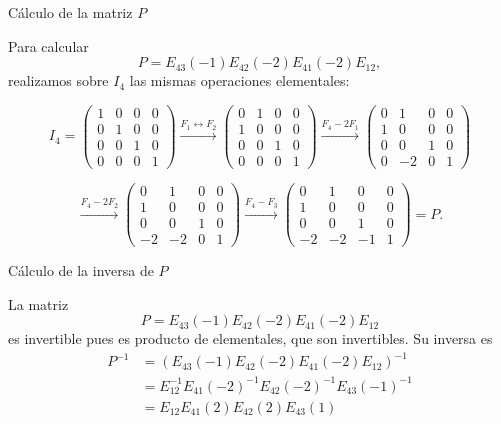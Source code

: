 \begin{frame}{Cálculo de la matriz \(P\)}

Para calcular
\[
P=E_{43}(-1)E_{42}(-2)E_{41}(-2)E_{12},
\]
realizamos sobre \(I_4\) las mismas operaciones elementales:

\[
I_4=
\begin{pmatrix}
1&0&0&0\\
0&1&0&0\\
0&0&1&0\\
0&0&0&1
\end{pmatrix}
\xrightarrow{F_1\leftrightarrow F_2}
\begin{pmatrix}
0&1&0&0\\
1&0&0&0\\
0&0&1&0\\
0&0&0&1
\end{pmatrix}
\xrightarrow{F_4-2F_1}
\begin{pmatrix}
0&1&0&0\\
1&0&0&0\\
0&0&1&0\\
0&-2&0&1
\end{pmatrix}\]

\[\xrightarrow{F_4-2F_2}
\begin{pmatrix}
0&1&0&0\\
1&0&0&0\\
0&0&1&0\\
-2&-2&0&1
\end{pmatrix}
\xrightarrow{F_4-F_3}
\begin{pmatrix}
0&1&0&0\\
1&0&0&0\\
0&0&1&0\\
-2&-2&-1&1
\end{pmatrix}=P.
\]


\end{frame}

\begin{frame}{Cálculo de la inversa de \(P\)}

La matriz
\[
P=
E_{43}(-1)E_{42}(-2)E_{41}(-2)E_{12}
\]
es invertible pues es producto de elementales, que son invertibles. Su inversa es
\begin{align*}
P^{-1}&=
(E_{43}(-1)E_{42}(-2)E_{41}(-2)E_{12})^{-1}\\
&= E_{12}^{-1} E_{41}(-2)^{-1} E_{42}(-2)^{-1} E_{43}(-1)^{-1}\\
&= E_{12} E_{41}(2) E_{42}(2) E_{43}(1)
\end{align*}

\end{frame}

